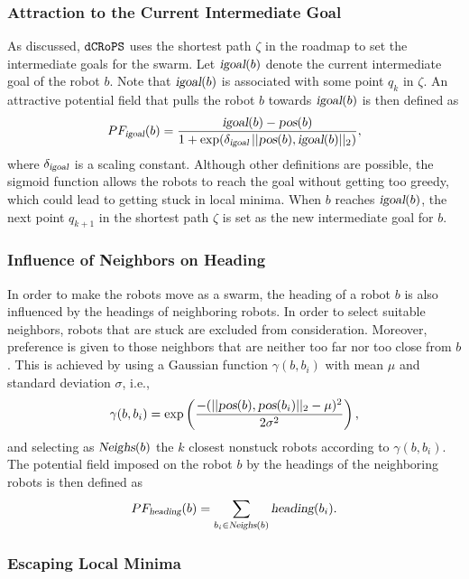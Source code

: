 \documentclass[letterpaper, 10pt, conference]{ieeeconf}
\newcommand{\Acronym}[1]{\ensuremath{{\small{\texttt{#1}}}}}
\newcommand{\Var}[1]{\ensuremath{{\small{\textsl{#1}}}}}
\newcommand{\Name}{\Acronym{dCRoPS}}
\begin{document}
\subsubsection{Attraction to the Current Intermediate Goal}
\label{sec:PFigoal} As
discussed, $\Name$ uses the shortest path $\zeta$ in the roadmap to
set the intermediate goals for the swarm. Let $\Var{igoal}(b)$ denote
the current intermediate goal of the robot $b$. Note that
$\Var{igoal}(b)$ is associated with some point $q_k$ in $\zeta$. An
attractive potential field that
pulls the robot $b$ towards $\Var{igoal}(b)$ is then defined as 
$$
PF_\Var{igoal}(b) = \frac{\Var{igoal}(b) - \Var{pos}(b)}{1 +
  \exp(\delta_\Var{igoal}\, ||\Var{pos}(b), \Var{igoal}(b)||_2)},
$$ where $\delta_\Var{igoal}$ is a scaling constant. Although other
definitions are possible, the sigmoid function allows the robots to
reach the goal without getting too greedy, which could lead to getting
stuck in local minima. When $b$ reaches $\Var{igoal}(b)$, the next
point $q_{k+1}$ in the shortest path $\zeta$ is set as the new
intermediate goal for $b$.

\subsubsection{Influence of Neighbors on Heading}
\label{sec:PFheading}
 In order to make
the robots move as a swarm, the heading of a robot $b$ is also
influenced by the headings of neighboring robots. In order to select
suitable neighbors, robots that are stuck
are excluded from consideration. Moreover, preference is given to those
neighbors that are neither too far nor too close from $b$. This is
achieved by using a Gaussian function $\gamma(b, b_i)$ with mean $\mu$ and standard
deviation $\sigma$, i.e.,
$$
\gamma(b, b_i) = \exp\left(\frac{-(||\Var{pos}(b), \Var{pos}(b_i)||_2 - \mu)^2}
{2\sigma^2}\right),
$$
and selecting as $\Var{Neighs}(b)$ the $k$ closest nonstuck robots
according to $\gamma(b, b_i)$.
The potential
field imposed on the robot $b$ by the headings of the neighboring robots
is then defined as
$$
PF_\Var{heading}(b) = \sum_{b_i \in
    \Var{Neighs}(b)} \Var{heading}(b_i).
$$




\subsubsection{Escaping Local Minima}
\label{sec:PFrand}
\end{document}
